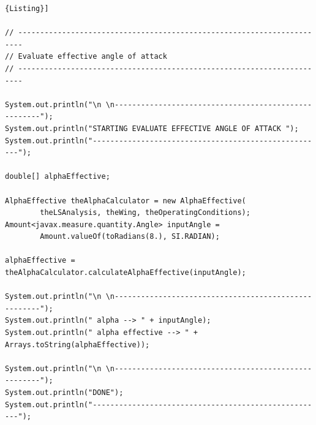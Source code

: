 \begin{lstlisting}[frame=rbl,caption={{\footnotesize Effective angle of attack Test Class}},label= [style=\bfseries]{Listing}]

// -----------------------------------------------------------------------
// Evaluate effective angle of attack
// -----------------------------------------------------------------------

System.out.println("\n \n-----------------------------------------------------");
System.out.println("STARTING EVALUATE EFFECTIVE ANGLE OF ATTACK ");
System.out.println("-----------------------------------------------------");

double[] alphaEffective;

AlphaEffective theAlphaCalculator = new AlphaEffective(
		theLSAnalysis, theWing, theOperatingConditions);
Amount<javax.measure.quantity.Angle> inputAngle = 
		Amount.valueOf(toRadians(8.), SI.RADIAN);

alphaEffective = theAlphaCalculator.calculateAlphaEffective(inputAngle);

System.out.println("\n \n-----------------------------------------------------");
System.out.println(" alpha --> " + inputAngle);
System.out.println(" alpha effective --> " + Arrays.toString(alphaEffective));

System.out.println("\n \n-----------------------------------------------------");
System.out.println("DONE");
System.out.println("-----------------------------------------------------");

\end{lstlisting}
